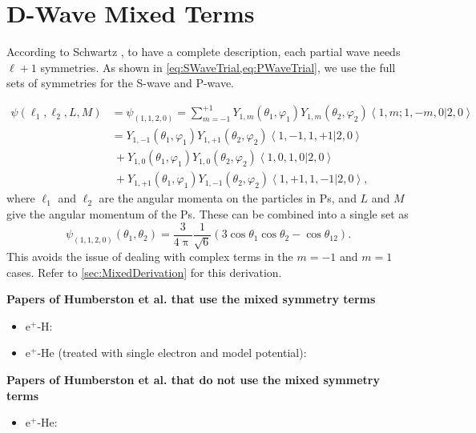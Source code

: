 \documentclass[Dissertation.tex]{subfiles}
\begin{document}
\section{D-Wave Mixed Terms}
\label{sec:MixedTerms}

According to Schwartz \cite{Schwartz1961a}, to have a complete description, each partial wave needs $\ell+1$ symmetries. As shown in \cref{eq:SWaveTrial,eq:PWaveTrial}, we use the full sets of symmetries for the S-wave and P-wave.

\begin{align}
\label{eq:MixedAng}
\psi(\ell_1,\ell_2,L,M) &= \psi_{(1,1,2,0)} = \sum_{m=-1}^{+1} Y_{1,m}(\theta_1,\varphi_1) Y_{1,m}(\theta_2,\varphi_2) \left< 1,m; 1,-m,0 | 2,0 \right> \nonumber \\
	&= Y_{1,-1}(\theta_1,\varphi_1) Y_{1,+1}(\theta_2,\varphi_2)
    \left< 1,-1,1,+1 | 2,0 \right> \nonumber \\
& \  + Y_{1,0}(\theta_1,\varphi_1) Y_{1,0}(\theta_2,\varphi_2)
    \left< 1,0,1,0 | 2,0 \right> \nonumber \\
& \ + Y_{1,+1}(\theta_1,\varphi_1) Y_{1,-1}(\theta_2,\varphi_2)
   \left< 1,+1,1,-1 | 2,0 \right>,
\end{align}
where $\ell_1$ and $\ell_2$ are the angular momenta on the particles in Ps, and $L$ and $M$ give the angular momentum of the Ps.
These can be combined into a single set as
\begin{equation}
\label{eq:MixedAngSimple}
\psi_{(1,1,2,0)}(\theta_1,\theta_2) = \frac{3}{4\uppi} \frac{1}{\sqrt{6}} \left(3 \cos\theta_1 \cos\theta_2 - \cos\theta_{12} \right).
\end{equation}
This avoids the issue of dealing with complex terms in the $m = -1$ and $m = 1$ cases. Refer to \cref{sec:MixedDerivation} for this derivation.


\textbf{Papers of Humberston et al. that use the mixed symmetry terms}
\begin{itemize}
	\item e$^+$-H: \cite{Brown1985a,BrownThesis,WattsThesis,Humberston1997,VanReeth1997}
	\item e$^+$-He (treated with single electron and model potential): \cite{Dunn2000,DunnThesis}
\end{itemize}

\textbf{Papers of Humberston et al. that do not use the mixed symmetry terms}
\begin{itemize}
	\item e$^+$-He: \cite{VanReeth1997,VanReethThesis}
\end{itemize}
\end{document}
